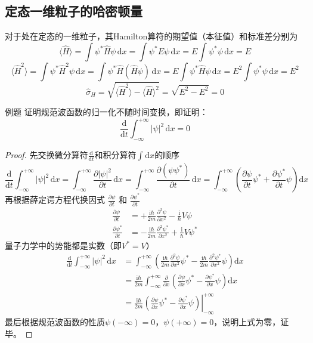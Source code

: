 \subsection{定态一维粒子的哈密顿量}
对于处在定态的一维粒子，其Hamilton算符的期望值（本征值）和标准差分别为
$$
    \langle\hat{H}\rangle=\int\psi^*\hat{H}\psi\,\mathrm{d}x=\int\psi^*E\psi\,\mathrm{d}x=E\int\psi^*\psi\,\mathrm{d}x=E
$$
$$
    \langle\hat{H}^2\rangle
    =\int\psi^*\hat{H}^2\psi\,\mathrm{d}x
    =\int\psi^*\hat{H}(\hat{H}\psi)\,\mathrm{d}x
    =E\int\psi^*\hat{H}\psi\,\mathrm{d}x
    =E^2\int\psi^*\psi\,\mathrm{d}x
    =E^2
$$
$$
    \hat{\sigma}_{H}
    =\sqrt{\langle\hat{H}^2\rangle-\langle\hat{H}\rangle^2}
    =\sqrt{E^2-E^2}
    =0
$$
\begin{question}{例题}
    证明规范波函数的归一化不随时间变换，即证明：
    $$
        \frac{\mathrm{d}}{\mathrm{d}t}\int_{-\infty}^{+\infty}|\psi|^2 \,\mathrm{d}x=0
    $$
\end{question}
\begin{proof}
    先交换微分算符$\frac{\mathrm{d}}{\mathrm{d}t}$和积分算符$\int_{}^{}\mathrm{d}x$的顺序
    $$
        \frac{\mathrm{d}}{\mathrm{d}t}\int_{-\infty}^{+\infty}|\psi|^2 \,\mathrm{d}x
        =\int_{-\infty}^{+\infty}\frac{\partial |\psi|^2}{\partial t} \,\mathrm{d}x
        =\int_{-\infty}^{+\infty}\frac{\partial (\psi\psi^*)}{\partial t} \,\mathrm{d}x
        =\int_{-\infty}^{+\infty}\left(\frac{\partial \psi}{\partial t}\psi^*+\frac{\partial \psi^*}{\partial t}\psi\right)\mathrm{d}x
    $$
    再根据薛定谔方程代换因式 $\frac{\partial \psi}{\partial t}$ 和 $\frac{\partial \psi^*}{\partial t}$
    $$
        \begin{aligned}
            \frac{\partial \psi}{\partial t}   & = +\frac{\mathrm{i}\hbar}{2m}\frac{\partial^2\psi}{\partial x^2}-\frac{\mathrm{i}}{\hbar}V\psi     \\
            \frac{\partial \psi^*}{\partial t} & = -\frac{\mathrm{i}\hbar}{2m}\frac{\partial^2\psi^*}{\partial x^2}+\frac{\mathrm{i}}{\hbar}V\psi^*
        \end{aligned}
    $$
    量子力学中的势能都是实数（即$V^*=V$）
    $$
        \begin{aligned}
            \frac{\mathrm{d}}{\mathrm{d}t}\int_{-\infty}^{+\infty}|\psi|^2 \,\mathrm{d}x
             & =\int_{-\infty}^{+\infty}\left(\frac{\mathrm{i}\hbar}{2m}\frac{\partial^2 \psi}{\partial x^2}\psi^*-\frac{\mathrm{i} \hbar}{2m}\frac{\partial^2 \psi^*}{\partial x^2}\psi\right)\mathrm{d}x \\
             & =\frac{\mathrm{i}\hbar}{2m}\int_{-\infty}^{+\infty}\frac{\partial}{\partial x}\left(\frac{\partial \psi}{\partial x}\psi^*-\frac{\partial \psi^*}{\partial x}\psi\right)\mathrm{d}x         \\
             & =\frac{\mathrm{i}\hbar}{2m}\left.\left(\frac{\partial \psi}{\partial x}\psi^*-\frac{\partial \psi^*}{\partial x}\psi\right)\right|_{-\infty}^{+\infty}
        \end{aligned}
    $$
    最后根据规范波函数的性质$\psi(-\infty)=0$，$\psi(+\infty)=0$，说明上式为零，证毕。
\end{proof}


